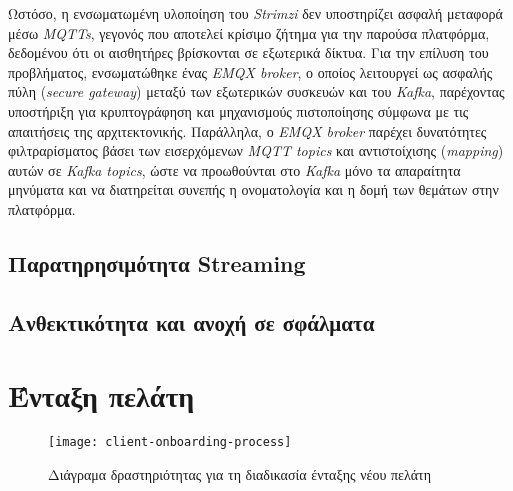 Ωστόσο, η ενσωματωμένη υλοποίηση του \textit{Strimzi} δεν υποστηρίζει ασφαλή
μεταφορά μέσω \textit{MQTTs}, γεγονός που αποτελεί κρίσιμο ζήτημα για την
παρούσα πλατφόρμα, δεδομένου ότι οι αισθητήρες βρίσκονται σε εξωτερικά δίκτυα.
Για την επίλυση του προβλήματος, ενσωματώθηκε ένας \textit{EMQX broker}, ο
οποίος λειτουργεί ως ασφαλής πύλη (\textit{secure gateway}) μεταξύ των
εξωτερικών συσκευών και του \textit{Kafka}, παρέχοντας υποστήριξη για
κρυπτογράφηση και μηχανισμούς πιστοποίησης σύμφωνα με τις απαιτήσεις της
αρχιτεκτονικής. Παράλληλα, ο \textit{EMQX broker} παρέχει δυνατότητες
φιλτραρίσματος βάσει των εισερχόμενων \textit{MQTT topics} και αντιστοίχισης
(\textit{mapping}) αυτών σε \textit{Kafka topics}, ώστε να προωθούνται στο
\textit{Kafka} μόνο τα απαραίτητα μηνύματα και να διατηρείται συνεπής η
ονοματολογία και η δομή των θεμάτων στην πλατφόρμα.

\subsection{Παρατηρησιμότητα Streaming}

\subsection{Ανθεκτικότητα και ανοχή σε σφάλματα}

\section{Ένταξη πελάτη}

\begin{figure}[H]
	\centering
	\texttt{[image: client-onboarding-process]}
	\caption{Διάγραμα δραστηριότητας για τη διαδικασία ένταξης νέου πελάτη}
	\label{fig:client-onboarding-activity}
\end{figure}

